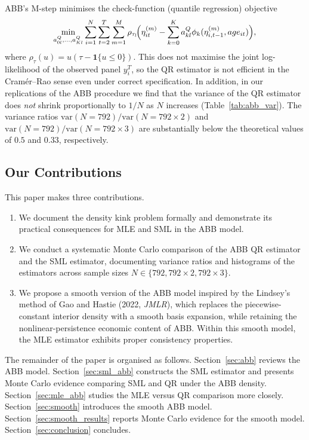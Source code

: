 \documentclass[12pt]{article}
\begin{document}
ABB's M-step minimises the check-function (quantile regression) objective
\begin{equation}\label{eq:check}
\min_{a_{0l}^Q,\ldots,a_{Kl}^Q}
\sum_{i=1}^N\sum_{t=2}^T\sum_{m=1}^M
\rho_{\tau_l}\!\Bigl(\eta_{it}^{(m)}-\sum_{k=0}^K
  a_{kl}^Q\phi_k(\eta_{i,t-1}^{(m)},age_{it})\Bigr),
\end{equation}
where $\rho_\tau(u)=u(\tau-\mathbf{1}\{u\le0\})$.
This does not maximise the joint log-likelihood of the observed panel $y_i^T$,
so the QR estimator is not efficient in the Cram\'er--Rao sense even under
correct specification.
In addition, in our replications of the ABB procedure we find that the
variance of the QR estimator does \emph{not} shrink proportionally to $1/N$
as $N$ increases (Table~\ref{tab:abb_var}).
The variance ratios $\text{var}(N=792)/\text{var}(N=792\times2)$ and
$\text{var}(N=792)/\text{var}(N=792\times3)$ are substantially
below the theoretical values of $0.5$ and $0.33$, respectively.

\subsection*{Our Contributions}

This paper makes three contributions.

\begin{enumerate}
\item We document the density kink problem formally and demonstrate its
  practical consequences for MLE and SML in the ABB model.
\item We conduct a systematic Monte Carlo comparison of the ABB QR estimator
  and the SML estimator, documenting variance ratios and histograms of the
  estimators across sample sizes $N\in\{792,792\times2,792\times3\}$.
\item We propose a smooth version of the ABB model inspired by the
  Lindsey's method of Gao and Hastie (2022, \textit{JMLR}), which replaces
  the piecewise-constant interior density with a smooth basis expansion,
  while retaining the nonlinear-persistence economic content of ABB.
  Within this smooth model, the MLE estimator exhibits proper consistency
  properties.
\end{enumerate}

The remainder of the paper is organised as follows.
Section~\ref{sec:abb} reviews the ABB model.
Section~\ref{sec:sml_abb} constructs the SML estimator and presents Monte
Carlo evidence comparing SML and QR under the ABB density.
Section~\ref{sec:mle_abb} studies the MLE versus QR comparison more closely.
Section~\ref{sec:smooth} introduces the smooth ABB model.
Section~\ref{sec:smooth_results} reports Monte Carlo evidence for the smooth
model.
Section~\ref{sec:conclusion} concludes.
\end{document}
